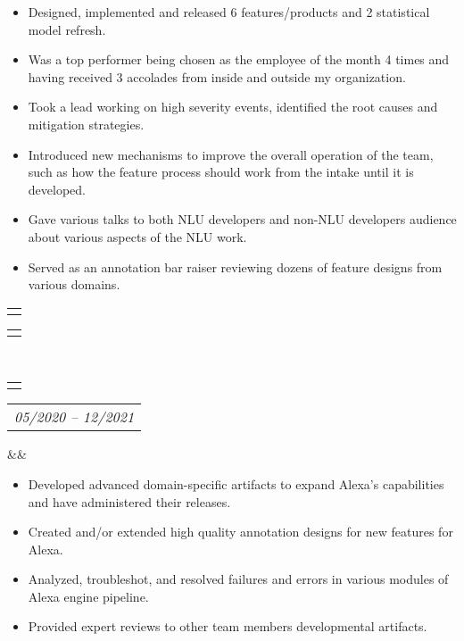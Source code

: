 \documentclass[12pt,letter,roman]{moderncv}        %
\makeatletter
\newcommand*{\customcventry}[7][.25em]{
  \begin{tabular}{@{}l} 
    {\bfseries #4}
  \end{tabular}
  \hfill%
  \begin{tabular}{l@{}}
     {\bfseries #5}
  \end{tabular} \\
  \begin{tabular}{@{}l} 
    {{\color{airforceblue}{\textbf{#3}}}}
  \end{tabular}
  \hfill%
  \begin{tabular}{l@{}}
     {\itshape #2}
  \end{tabular}
  \ifx&#7&%
  \else{\\%
    \begin{minipage}{\maincolumnwidth}%
      \small#7%
    \end{minipage}}\fi%
  \par\addvspace{#1}}
\makeatother
\begin{document}
{{{{{{\begin{itemize}
        \item{\small  Designed, implemented and released 6 features/products and 2 statistical model refresh.}
         \item{\small  Was a top performer being chosen as the employee of the month 4 times and having received 3 accolades from inside and outside my organization.}
          \item{\small  Took a lead working on high severity events, identified the root causes and mitigation strategies.}
           \item{\small  Introduced new mechanisms to improve the overall operation of the team, such as how the feature process should work from the intake until it is developed.}
                \item{\small  Gave various talks to both NLU developers and non-NLU developers audience about various aspects of the NLU work.}
                \item{\small  Served as an annotation bar raiser reviewing dozens of feature designs from various domains.}
        \end{itemize}
        }
        
                \vspace{-0.5em}
                
                        {\customcventry{05/2020 -- 12/2021}{Language Engineer I, Alexa Local Search NLU }{}{}
{}{}

\vspace{0.2em}

{\begin{itemize}
    
        \item{\small Developed advanced domain-specific artifacts to expand Alexa’s capabilities and have administered their releases.}
\item{\small Created and/or extended high quality annotation designs for new features for Alexa.}
\item{\small  Analyzed, troubleshot, and resolved failures and errors in various modules of Alexa engine pipeline. }
    \item{\small Provided expert reviews to other team members developmental artifacts.}


\end{itemize}}}}}}}}
\end{document}
